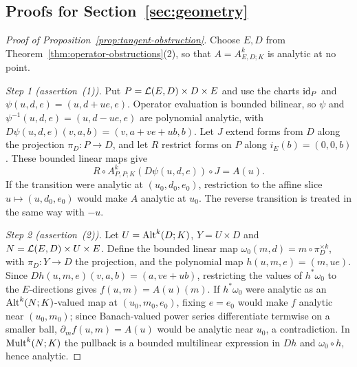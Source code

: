 \subsection{Proofs for Section~\ref{sec:geometry}}\label{dfr:ssec:geometry}

\begin{proof}[Proof of Proposition~\ref{prop:tangent-obstruction}]
Choose $E,D$ from Theorem~\ref{thm:operator-obstructions}(2), so that $A=A^k_{E,D;K}$ is analytic at no point.

\emph{Step 1 (assertion~(1)).} Put $P=\mathcal L(E,D)\times D\times E$ and use the charts $\mathrm{id}_P$ and $\psi(u,d,e)=(u,d+ue,e)$. Operator evaluation is bounded bilinear, so $\psi$ and $\psi^{-1}(u,d,e)=(u,d-ue,e)$ are polynomial analytic, with $D\psi(u,d,e)(v,a,b)=(v,a+ve+ub,b)$. Let $J$ extend forms from $D$ along the projection $\pi_D\colon P\to D$, and let $R$ restrict forms on $P$ along $i_E(b)=(0,0,b)$. These bounded linear maps give
\[
 R\circ A^k_{P,P;K}(D\psi(u,d,e))\circ J=A(u).
\]
If the transition were analytic at $(u_0,d_0,e_0)$, restriction to the affine slice $u\mapsto(u,d_0,e_0)$ would make $A$ analytic at $u_0$. The reverse transition is treated in the same way with $-u$.

\emph{Step 2 (assertion~(2)).} Let $U=\operatorname{Alt}^k(D;K)$, $Y=U\times D$ and $N=\mathcal L(E,D)\times U\times E$. Define the bounded linear map $\omega_0(m,d)=m\circ\pi_D^{\times k}$, with $\pi_D\colon Y\to D$ the projection, and the polynomial map $h(u,m,e)=(m,ue)$. Since $Dh(u,m,e)(v,a,b)=(a,ve+ub)$, restricting the values of $h^*\omega_0$ to the $E$\nobreakdash-directions gives $f(u,m)=A(u)(m)$. If $h^*\omega_0$ were analytic as an $\operatorname{Alt}^k(N;K)$\nobreakdash-valued map at $(u_0,m_0,e_0)$, fixing $e=e_0$ would make $f$ analytic near $(u_0,m_0)$; since Banach-valued power series differentiate termwise on a smaller ball, $\partial_mf(u,m)=A(u)$ would be analytic near $u_0$, a contradiction. In $\operatorname{Mult}^k(N;K)$ the pullback is a bounded multilinear expression in $Dh$ and $\omega_0\circ h$, hence analytic.
\end{proof}

